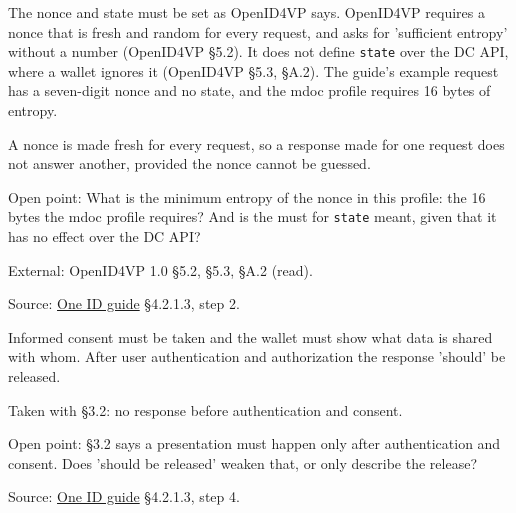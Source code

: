 \begin{definition}
  \label{def:c72}
  \notready
  The nonce and state must be set as OpenID4VP says. OpenID4VP requires a
  nonce that is fresh and random for every request, and asks for 'sufficient
  entropy' without a number (OpenID4VP §5.2). It does not define
  \texttt{state} over the DC API, where a wallet ignores it (OpenID4VP §5.3,
  §A.2). The guide's example request has a seven-digit nonce and no state,
  and the mdoc profile requires 16 bytes of entropy.

  A nonce is made fresh for every request, so a response made for one request
  does not answer another, provided the nonce cannot be guessed.

  Open point: What is the minimum entropy of the nonce in this profile: the 16
  bytes the mdoc profile requires? And is the must for \texttt{state} meant,
  given that it has no effect over the DC API?

  External: OpenID4VP 1.0 §5.2, §5.3, §A.2 (read).

  Source:
  \href{https://standards.atlassian.net/wiki/spaces/OneID/pages/2947416082/Technical+Implementation+Guide}{One
  ID guide} §4.2.1.3, step 2.
\end{definition}

\begin{definition}
  \label{def:c75}
  \notready
  Informed consent must be taken and the wallet must show what data is shared
  with whom. After user authentication and authorization the response
  'should' be released.

  Taken with §3.2: no response before authentication and consent.

  Open point: §3.2 says a presentation must happen only after authentication
  and consent. Does 'should be released' weaken that, or only describe the
  release?

  Source:
  \href{https://standards.atlassian.net/wiki/spaces/OneID/pages/2947416082/Technical+Implementation+Guide}{One
  ID guide} §4.2.1.3, step 4.
\end{definition}

